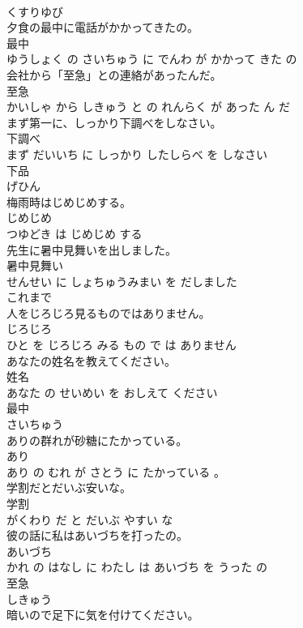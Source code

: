 \documentclass[8pt]{extreport}
\begin{document}
\begin{CJK}{UTF8}{min}
\\	くすりゆび			
\\	夕食の最中に電話がかかってきたの。	
\\	最中 
\\	ゆうしょく の さいちゅう に でんわ が かかって きた の			
\\	会社から「至急」との連絡があったんだ。	
\\	至急 
\\	かいしゃ から しきゅう と の れんらく が あった ん だ			
\\	まず第一に、しっかり下調べをしなさい。	
\\	下調べ 
\\	まず だいいち に しっかり したしらべ を しなさい			
\\	下品	
\\	げひん			
\\	梅雨時はじめじめする。	
\\	じめじめ 
\\	つゆどき は じめじめ する			
\\	先生に暑中見舞いを出しました。	
\\	暑中見舞い 
\\	せんせい に しょちゅうみまい を だしました			
\\	これまで	
\\	人をじろじろ見るものではありません。	
\\	じろじろ 
\\	ひと を じろじろ みる もの で は ありません			
\\	あなたの姓名を教えてください。	
\\	姓名 
\\	あなた の せいめい を おしえて ください			
\\	最中	
\\	さいちゅう			
\\	ありの群れが砂糖にたかっている。	
\\	あり 
\\	あり の むれ が さとう に たかっている 。			
\\	学割だとだいぶ安いな。	
\\	学割 
\\	がくわり だ と だいぶ やすい な			
\\	彼の話に私はあいづちを打ったの。	
\\	あいづち 
\\	かれ の はなし に わたし は あいづち を うった の			
\\	至急	
\\	しきゅう			
\\	暗いので足下に気を付けてください。	

\end{CJK}
\end{document}
